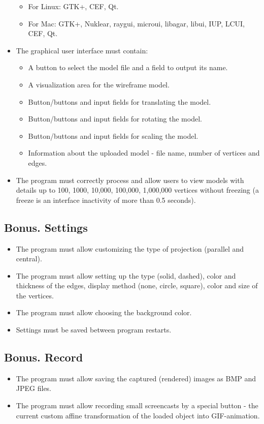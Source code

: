 \documentclass{article}
\begin{document}
\begin{itemize}
        \begin{itemize}
          \item For Linux: GTK+, CEF, Qt.
          \item For Mac: GTK+, Nuklear, raygui, microui, libagar, libui, IUP, LCUI, CEF, Qt.
        \end{itemize}
  \item The graphical user interface must contain:
        \begin{itemize}
          \item A button to select the model file and a field to output its name.
          \item A visualization area for the wireframe model.
          \item Button/buttons and input fields for translating the model.
          \item Button/buttons and input fields for rotating the model.
          \item Button/buttons and input fields for scaling the model.
          \item Information about the uploaded model - file name, number of vertices and edges.
        \end{itemize}
  \item The program must correctly process and allow users to view models with details up to 100, 1000, 10,000, 100,000, 1,000,000 vertices without freezing (a freeze is an interface inactivity of more than 0.5 seconds).
\end{itemize}

\subsection{Bonus. Settings}
\begin{itemize}
  \item The program must allow customizing the type of projection (parallel and central).
  \item The program must allow setting up the type (solid, dashed), color and thickness of the edges, display method (none, circle, square), color and size of the vertices.
  \item The program must allow choosing the background color.
  \item Settings must be saved between program restarts.
\end{itemize}

\subsection{Bonus. Record}
\begin{itemize}
  \item The program must allow saving the captured (rendered) images as BMP and JPEG files.
  \item The program must allow recording small screencasts by a special button - the current custom affine transformation of the loaded object into GIF-animation.
\end{itemize}
\end{document}
